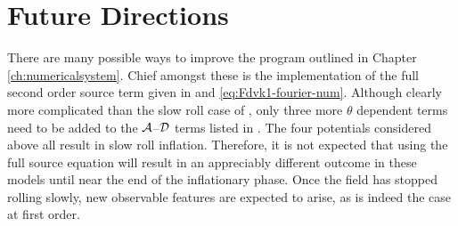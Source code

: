\section{Future Directions}
\label{sec:next-res}

There are many possible ways to improve the program outlined in
Chapter \ref{ch:numericalsystem}. Chief amongst these is the implementation of the
full second order source term given in  and
\eqref{eq:Fdvk1-fourier-num}. Although clearly
more complicated than the slow roll case of ,
only three more $\theta$ dependent terms need to be added to the $\mathcal{A}$--$\mathcal{D}$ terms
listed in .  The four potentials considered above all result in 
slow roll inflation. Therefore, it is not expected that
using the full source equation will result in an appreciably
different outcome in these models until near the end of the inflationary phase. Once
the field has stopped rolling slowly, new observable features are expected to
arise, as is indeed the case at first order. 


